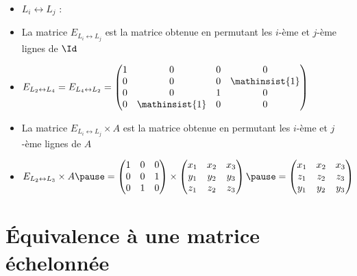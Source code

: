 \begin{frame}
\begin{itemize}\setlength{\itemsep}{8pt}
  \item $L_i \leftrightarrow L_j$ : 
\pause 
  \item La matrice  $E_{L_i \leftrightarrow L_j}$ est la matrice obtenue 
   en permutant les $i$-ème et $j$-ème lignes de $\Id$
\pause
  \item $ E_{L_2 \leftrightarrow L_4} = E_{L_4 \leftrightarrow L_2} = 
   \begin{pmatrix}
    1 & 0 & 0 & 0\\
    0 & 0 & 0 & \mathinsist{1}\\
    0 & 0 & 1 & 0\\
    0 & \mathinsist{1} & 0 & 0
    \end{pmatrix}$  
\pause
  \item La matrice  $E_{L_i \leftrightarrow L_j} \times A$ est la matrice obtenue 
   en permutant les $i$-ème et $j$-ème lignes de $A$
\pause   
   
  \item $E_{L_2 \leftrightarrow L_3}  \times A
  \pause
= \begin{pmatrix}
  1&0&0\\0&0&1\\0&1&0  
  \end{pmatrix}
  \times
  \begin{pmatrix}
  x_1&x_2&x_3\\y_1&y_2&y_3\\z_1&z_2&z_3  
  \end{pmatrix}
  \pause
  =   \begin{pmatrix}
  x_1&x_2&x_3\\z_1&z_2&z_3\\ y_1&y_2&y_3  
  \end{pmatrix}
$ 
\end{itemize}

\end{frame}


\section{\'Equivalence à une matrice échelonnée}

